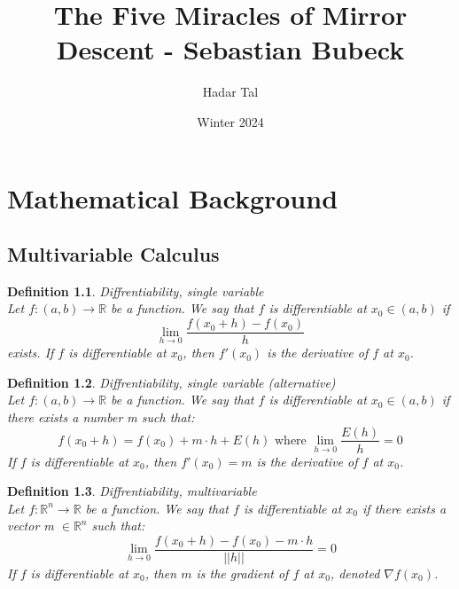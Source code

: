 \documentclass[11pt]{book} %
\title{The Five Miracles of Mirror Descent - Sebastian Bubeck}
\author{Hadar Tal}
\date{Winter 2024}
\newtheorem{definition}{Definition}[section]
\begin{document}
\frontmatter
\maketitle
\tableofcontents


\mainmatter
\chapter{Mathematical Background}

\section{Multivariable Calculus}
\begin{definition}{Diffrentiability, single variable} \\
Let $f: (a,b) \rightarrow \mathbb{R}$ be a function. We say that $f$ is differentiable at $x_0 \in (a,b)$ if
\begin{equation}
    \lim_{h \rightarrow 0} \frac{f(x_0 + h) - f(x_0)}{h}
\end{equation}
exists. If $f$ is differentiable at $x_0$, then $f'(x_0)$ is the derivative of $f$ at $x_0$.
\end{definition} 

\bigbreak

\begin{definition}{Diffrentiability, single variable (alternative)} \\
Let $f: (a,b) \rightarrow \mathbb{R}$ be a function. We say that $f$ is differentiable at $x_0 \in (a,b)$ if there exists a number m such that:
\begin{equation}
    f(x_0 + h) = f(x_0) + m \cdot h + E(h) \text{ where } \lim_{h \rightarrow 0} \frac{E(h)}{h} = 0
\end{equation}
If $f$ is differentiable at $x_0$, then $f'(x_0) = m$ is the derivative of $f$ at $x_0$.
\end{definition}

\bigbreak

\begin{definition}{Diffrentiability, multivariable} \\
Let $f: \mathbb{R}^n \rightarrow \mathbb{R}$ be a function. We say that $f$ is differentiable at $x_0$ if there exists a vector m $\in \mathbb{R}^n$ such that:
\begin{equation}
    \lim_{h \rightarrow 0} \frac{f(x_0 + h) - f(x_0) - m \cdot h}{||h||} = 0
\end{equation}
If $f$ is differentiable at $x_0$, then $m$ is the gradient of $f$ at $x_0$, denoted $\nabla f(x_0)$.
\end{definition}
\end{document}
